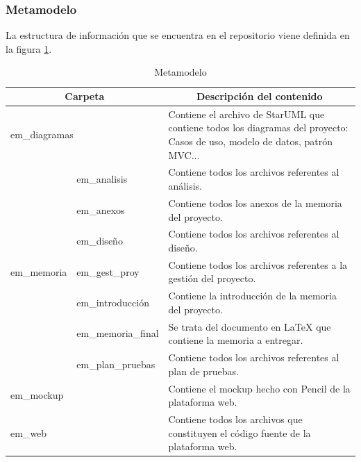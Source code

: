 \subsubsection{Metamodelo}
La estructura de información que se encuentra en el repositorio viene definida en la figura \ref{tab_metamodelo}.

\begin{table}[htpb]
\centering
\begin{tabularx}{\textwidth}{|l|l|X|}
\hline
\multicolumn{2}{|c|}{Carpeta}                     & \multicolumn{1}{c|}{Descripción del contenido}                                                                             \\ \hline
\multicolumn{2}{|X|}{em\_diagramas}               & Contiene el archivo de StarUML que contiene todos los diagramas del proyecto: Casos de uso, modelo de datos, patrón MVC... \\ \hline
\multirow{7}{*}{em\_memoria} & em\_analisis       & Contiene todos los archivos referentes al análisis.                                                                        \\ \cline{2-3} 
                             & em\_anexos         & Contiene todos los anexos de la memoria del proyecto.                                                                      \\ \cline{2-3} 
                             & em\_diseño         & Contiene todos los archivos referentes al diseño.                                                                          \\ \cline{2-3} 
                             & em\_gest\_proy     & Contiene todos los archivos referentes a la gestión del proyecto.                                                          \\ \cline{2-3} 
                             & em\_introducción   & Contiene la introducción de la memoria del proyecto.                                                                       \\ \cline{2-3} 
                             & em\_memoria\_final & Se trata del documento en LaTeX que contiene la memoria a entregar.                                                        \\ \cline{2-3} 
                             & em\_plan\_pruebas  & Contiene todos los archivos referentes al plan de pruebas.                                                                 \\ \hline
\multicolumn{2}{|X|}{em\_mockup}                  & Contiene el mockup hecho con Pencil de la plataforma web.                                                                  \\ \hline
\multicolumn{2}{|X|}{em\_web}                     & Contiene todos los archivos que constituyen el código fuente de la plataforma web.                                         \\ \hline
\end{tabularx}
\caption{Metamodelo}
\label{tab_metamodelo}
\end{table}

